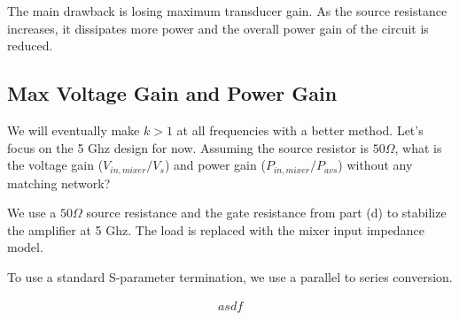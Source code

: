The main drawback is losing maximum transducer gain. As the source resistance increases, it dissipates more power and the overall power gain of the circuit is reduced.

\subsection{Max Voltage Gain and Power Gain}
{\color{blue} We will eventually make $k > 1$ at all frequencies with a better method. Let's focus on the 5 Ghz design for now. Assuming the source resistor is $50 \Omega$, what is the voltage gain ($V_{in,mixer}/V_s$) and power gain ($P_{in,mixer}/P_{avs}$) without any matching network?}

We use a $50 \Omega$ source resistance and the gate resistance from part (d) to stabilize the amplifier at 5 Ghz. The load is replaced with the mixer input impedance model.

To use a standard S-parameter termination, we use a parallel to series conversion.

\begin{align*}
asdf
\end{align*}



